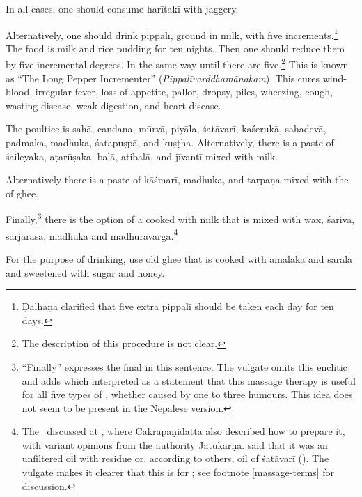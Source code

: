 \begin{translation}
In all cases, one should consume \gls{harītakī} with jaggery.

Alternatively, one should drink \gls{pippalī}, ground in milk, with
five increments.\footnote{Ḍalhaṇa clarified that five extra
    \gls{pippalī} should be taken each day for ten days.} The food is milk
    and rice pudding for ten nights. Then one should reduce them by five
    incremental degrees.  In the same way until there are
    five.\footnote{The description of this procedure is not clear.} This
        is known as “The Long Pepper Incrementer”
        (\emph{Pippalīvarddhamānakam}). This cures wind-blood, irregular
        fever, loss of appetite, pallor, dropsy, piles, wheezing, cough,
        wasting disease, weak digestion, and heart disease.
        
The poultice is  \gls{sahā}, \gls{candana}, \gls{mūrvā}, \gls{piyāla},
\gls{śatāvarī}, \gls{kaśerukā}, \gls{sahadevā}, \gls{padmaka},
\gls{madhuka}, \gls{śatapuṣpā}, and \gls{kuṣṭha}. Alternatively, there
is a paste of \gls{śaileyaka}, \gls{aṭarūṣaka}, \gls{balā},
\gls{atibalā}, and \gls{jīvantī} mixed with milk.

Alternatively there is a paste of \gls{kāśmarī}, \gls{madhuka}, and \gls{tarpaṇa} mixed with the  of ghee. 

Finally,\footnote{“Finally” expresses the final  in this
    sentence.  The vulgate omits this enclitic and adds 
    which  interpreted as a statement that this
    massage therapy is useful for all five types of , whether caused by one to three humours.
    This idea does not seem to be present in the Nepalese version.}  there
    is the option of a  cooked with milk that
    is mixed with wax, \gls{śārivā},
    \gls{sarjarasa}, \gls{madhuka} and \gls{madhuravarga}.\footnote{The
        \CS\ discussed  at , where
        Cakrapāṇidatta also described how to prepare it, with variant opinions
        from the authority Jatūkarṇa.  said that it was
        an unfiltered oil with residue or, according to others, oil of
        \gls{śatāvarī} (). The vulgate makes it clearer that
        this is for ; see footnote
        \ref{massage-terms} for discussion.}

For the purpose of drinking, use old ghee that is cooked with
\gls{āmalaka} and \gls{sarala} and sweetened with sugar and honey.


\end{translation}

